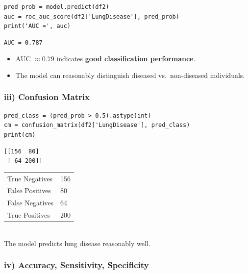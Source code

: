 \documentclass[12pt,a4paper]{article}
\begin{document}
\begin{lstlisting}
pred_prob = model.predict(df2)
auc = roc_auc_score(df2['LungDisease'], pred_prob)
print('AUC =', auc)
\end{lstlisting}

\begin{outputbox}
\begin{verbatim}
AUC = 0.787
\end{verbatim}
\end{outputbox}

\begin{interpbox}
\begin{itemize}[noitemsep]
  \item AUC $\approx 0.79$ indicates \textbf{good classification performance}.
  \item The model can reasonably distinguish diseased vs.\ non-diseased individuals.
\end{itemize}
\end{interpbox}

\subsubsection{iii) Confusion Matrix}

\begin{lstlisting}
pred_class = (pred_prob > 0.5).astype(int)
cm = confusion_matrix(df2['LungDisease'], pred_class)
print(cm)
\end{lstlisting}

\begin{outputbox}
\begin{verbatim}
[[156  80]
 [ 64 200]]
\end{verbatim}
\end{outputbox}

\begin{interpbox}
\begin{tabular}{ll}
True Negatives  & 156 \\
False Positives & 80  \\
False Negatives & 64  \\
True Positives  & 200 \\
\end{tabular}\\[4pt]
The model predicts lung disease reasonably well.
\end{interpbox}

\subsubsection{iv) Accuracy, Sensitivity, Specificity}
\end{document}
